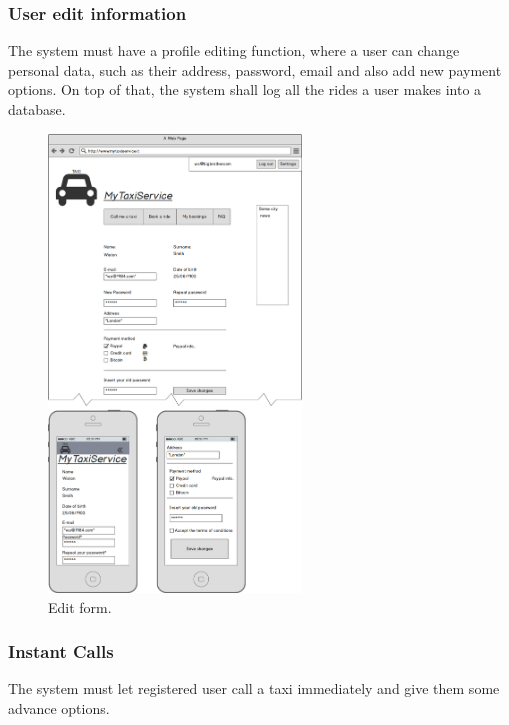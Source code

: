 		\subsubsection {User edit information}
			The system must have a profile editing function, where a user can change personal data, such as their address, password, email
			and also add new payment options. On top of that, the system shall log all the rides a user makes into a database.
			\begin{figure}[h!]
				\includegraphics[width=0.6\textwidth]{mockup/edituser.png}
				\caption{Edit form.}
			\end{figure}
			\newpage
		\subsubsection {Instant Calls}
			The system must let registered user call a taxi immediately and give them some advance options.

